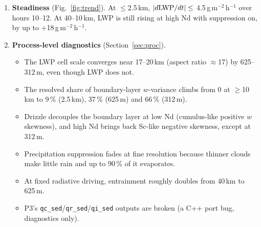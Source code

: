 \documentclass[10pt]{article}
\begin{document}
\begin{enumerate}
At 312\,m (16 pairs so far, Nd 20--200), $|\Delta{\rm LWP}| \leq$ 1.0\,g\,m$^{-2}$ and $|\Delta{\rm cloud\ cover}| \leq$ 0.006.
The one consistent signal is $w_e$, which is 0.02--0.07\,mm\,s$^{-1}$ lower ($<$1\,\%).
\item \textbf{Steadiness} (Fig.~\ref{fig:trend}). At $\leq$2.5\,km, $|d{\rm LWP}/dt| \leq$ 4.5\,g\,m$^{-2}$\,h$^{-1}$ over hours 10--12.
At 40--10\,km, LWP is still rising at high Nd with suppression on, by up to +18\,g\,m$^{-2}$\,h$^{-1}$.
\item \textbf{Process-level diagnostics} (Section~\ref{sec:proc}).
\begin{itemize}
\item The LWP cell scale converges near 17--20\,km (aspect ratio $\approx$17) by 625--312\,m, even though LWP does not.
\item The resolved share of boundary-layer $w$-variance climbs from 0 at $\geq$10\,km to 9\,\% (2.5\,km), 37\,\% (625\,m) and 66\,\% (312\,m).
\item Drizzle decouples the boundary layer at low Nd (cumulus-like positive $w$ skewness), and high Nd brings back Sc-like negative skewness, except at 312\,m.
\item Precipitation suppression fades at fine resolution because thinner clouds make little rain and up to 90\,\% of it evaporates.
\item At fixed radiative driving, entrainment roughly doubles from 40\,km to 625\,m.
\item P3's \texttt{qc\_sed}/\texttt{qr\_sed}/\texttt{qi\_sed} outputs are broken (a C++ port bug, diagnostics only).
\end{itemize}
\end{enumerate}
\end{document}
